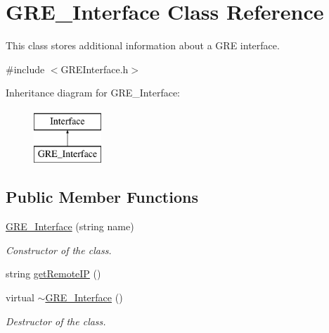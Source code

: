 \hypertarget{classGRE__Interface}{\section{\-G\-R\-E\-\_\-\-Interface \-Class \-Reference}
\label{classGRE__Interface}
}


\-This class stores additional information about a \-G\-R\-E interface.  




{\ttfamily \#include $<$\-G\-R\-E\-Interface.\-h$>$}

\-Inheritance diagram for \-G\-R\-E\-\_\-\-Interface\-:\begin{figure}[H]
\begin{center}
\leavevmode
\includegraphics[height=2.000000cm]{classGRE__Interface}
\end{center}
\end{figure}
\subsection*{\-Public \-Member \-Functions}
\begin{DoxyCompactItemize}
\item 
\hyperlink{classGRE__Interface_ac9f4281677d947c3cb11ffa6bdcfa4a0}{\-G\-R\-E\-\_\-\-Interface} (string name)
\begin{DoxyCompactList}\small\item\em \-Constructor of the class. \end{DoxyCompactList}\item 
string \hyperlink{classGRE__Interface_a9a9a8f8dea29c1261df0dd57cabdd24f}{get\-Remote\-I\-P} ()
\item 
\hypertarget{classGRE__Interface_a6a1ac00eb3531c0dfb79ac662f144f22}{virtual \hyperlink{classGRE__Interface_a6a1ac00eb3531c0dfb79ac662f144f22}{$\sim$\-G\-R\-E\-\_\-\-Interface} ()}\label{classGRE__Interface_a6a1ac00eb3531c0dfb79ac662f144f22}

\begin{DoxyCompactList}\small\item\em \-Destructor of the class. \end{DoxyCompactList}\end{DoxyCompactItemize}
